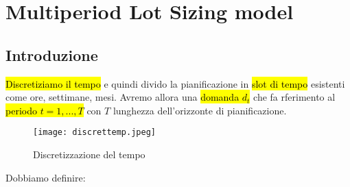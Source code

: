 \newpage
\section{Multiperiod Lot Sizing model}

\subsection{Introduzione}
\hl{Discretiziamo il tempo} e quindi divido la pianificazione in \hl{slot di tempo} esistenti come ore, settimane, mesi. Avremo allora una \hl{domanda $d_t$} che fa rferimento al \hl{periodo $t=1,...,T$} con $T$ lunghezza dell'orizzonte di pianificazione.


\begin{figure}[H]
\centering
\texttt{[image: discrettemp.jpeg]}
\caption{Discretizzazione del tempo} 
\label{discrettemp}
\end{figure}


Dobbiamo definire:

